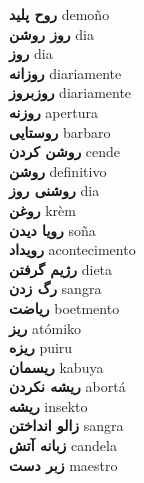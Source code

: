 \textbf{ روح پلید  } demoño \\
\textbf{ روز روشن  } dia \\
\textbf{ روز  } dia \\
\textbf{ روزانه  } diariamente \\
\textbf{ روزبروز  } diariamente \\
\textbf{ روزنه  } apertura \\
\textbf{ روستایی  } barbaro \\
\textbf{ روشن کردن  } cende \\
\textbf{ روشن  } definitivo \\
\textbf{ روشنی روز  } dia \\
\textbf{ روغن  } krèm \\
\textbf{ رویا دیدن  } soña \\
\textbf{ رویداد  } acontecimento \\
\textbf{ رژیم گرفتن  } dieta \\
\textbf{ رگ زدن  } sangra \\
\textbf{ ریاضت  } boetmento \\
\textbf{ ریز  } atómiko \\
\textbf{ ریزه  } puiru \\
\textbf{ ریسمان  } kabuya \\
\textbf{ ریشه نکردن  } abortá \\
\textbf{ ریشه  } insekto \\
\textbf{ زالو انداختن  } sangra \\
\textbf{ زبانه آتش  } candela \\
\textbf{ زبر دست  } maestro \\
